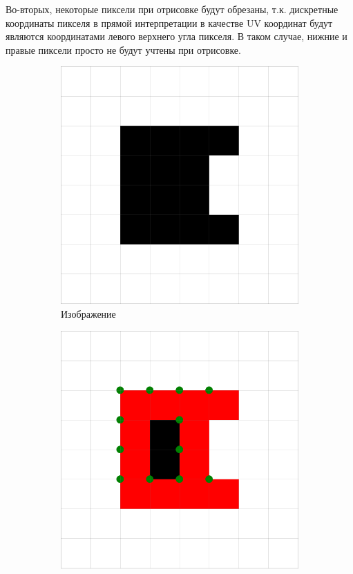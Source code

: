 \documentclass{fefu_thesis/cls/fefu}
\begin{document}
    Во-вторых, некоторые пиксели при отрисовке будут обрезаны, т.к. дискретные координаты пикселя в прямой интерпретации в качестве UV координат будут являются координатами левого верхнего угла пикселя. В таком случае, нижние и правые пиксели просто не будут учтены при отрисовке.

    \begin{figure}[H]
        \centering
        \begin{subfigure}[t]{.33\linewidth}
            \centering
            \includegraphics[scale=0.2]{images/SuzukiExample2.png}
            \caption{Изображение}
        \end{subfigure}
        \begin{subfigure}[t]{.33\linewidth}
            \centering
            \includegraphics[scale=0.2]{images/SuzukiExample2_uvs.png}

\end{subfigure}
\end{figure}
\end{document}
